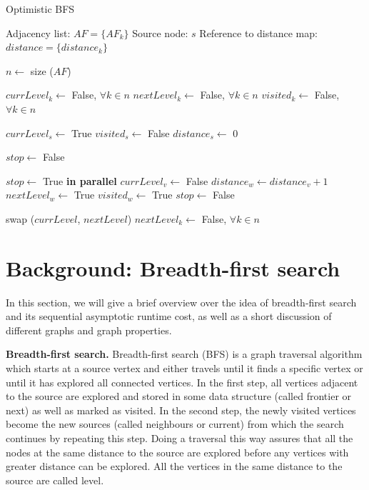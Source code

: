 \documentclass[letterpaper]{article}
\newcommand{\mypar}[1]{{\bf #1.}} %
\begin{document}
			
			\begin{algorithm}
				\caption{Optimistic BFS}
				\begin{algorithmic}[1]
					\Require
						\Statex Adjacency list: $AF = \lbrace AF_k \rbrace$
						\Statex Source node: $s$
						\Statex Reference to distance map: $distance = \lbrace distance_k \rbrace$
					\Statex

					\State $n \gets$ size ($AF$) 					
					
					\State $currLevel_k \gets$ False, $\forall k \in n$
					\State $nextLevel_k \gets$ False, $\forall k \in n$
					\State $visited_k \gets$ False, $\forall k \in n$
					\Statex
					
					\State $currLevel_s \gets$ True
					\State $visited_s \gets$ False
					\State $distance_s \gets$ 0
					\Statex
					
					\State $stop \gets$ False
					\Statex
					
						\State $stop\gets$ True
						 \textbf{in parallel}
								\State $currLevel_v \gets$ False
										\State $distance_w \gets distance_v + 1$
										\State $nextLevel_w \gets$ True
										\State $visited_w \gets$ True
										\State $stop \gets$ False
									\EndIf
								\EndFor
							\EndIf
						\EndFor
						
						\vspace{-0.051cm} %
						
						\State swap ($currLevel$, $nextLevel$)
						\State $nextLevel_k \gets$ False, $\forall k\in n$
					\EndWhile
				\end{algorithmic}
			\end{algorithm}


						
			
	\section{Background: Breadth-first search}\label{sec:background}
	
	
	In this section, we will give a brief overview over the idea of breadth-first search and its sequential asymptotic runtime cost, as well as	 a short discussion of different graphs and graph properties. 
	
	
	\mypar{Breadth-first search}
	Breadth-first search (BFS) is a graph traversal algorithm which starts at a source vertex and either travels until it finds a specific vertex or until it has explored all connected vertices. 
	In the first step, all vertices adjacent to the source are explored and stored in some data structure (called frontier or next) as well as marked as visited. 
	In the second step, the newly visited vertices become the new sources (called neighbours or current) from which the search continues by repeating this step. 
	Doing a traversal this way assures that all the nodes at the same distance to the source are explored before any vertices with greater distance can be explored. 
	All the vertices in the same distance to the source are called level.
	
\end{document}
